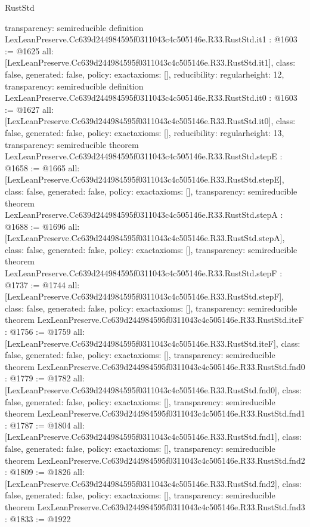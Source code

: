 \begin{lexlean}{RustStd}
\begin{coremodule}
{  transparency: semireducible
}
definition LexLeanPreserve.Cc639d244984595f0311043c4c505146e.R33.RustStd.it1 : @1603 := @1625 {
  all: [LexLeanPreserve.Cc639d244984595f0311043c4c505146e.R33.RustStd.it1],
  class: false,
  generated: false,
  policy: exact{axioms: []},
  reducibility: regular{height: 12},
  transparency: semireducible
}
definition LexLeanPreserve.Cc639d244984595f0311043c4c505146e.R33.RustStd.it0 : @1603 := @1627 {
  all: [LexLeanPreserve.Cc639d244984595f0311043c4c505146e.R33.RustStd.it0],
  class: false,
  generated: false,
  policy: exact{axioms: []},
  reducibility: regular{height: 13},
  transparency: semireducible
}
theorem LexLeanPreserve.Cc639d244984595f0311043c4c505146e.R33.RustStd.stepE : @1658 := @1665 {
  all: [LexLeanPreserve.Cc639d244984595f0311043c4c505146e.R33.RustStd.stepE],
  class: false,
  generated: false,
  policy: exact{axioms: []},
  transparency: semireducible
}
theorem LexLeanPreserve.Cc639d244984595f0311043c4c505146e.R33.RustStd.stepA : @1688 := @1696 {
  all: [LexLeanPreserve.Cc639d244984595f0311043c4c505146e.R33.RustStd.stepA],
  class: false,
  generated: false,
  policy: exact{axioms: []},
  transparency: semireducible
}
theorem LexLeanPreserve.Cc639d244984595f0311043c4c505146e.R33.RustStd.stepF : @1737 := @1744 {
  all: [LexLeanPreserve.Cc639d244984595f0311043c4c505146e.R33.RustStd.stepF],
  class: false,
  generated: false,
  policy: exact{axioms: []},
  transparency: semireducible
}
theorem LexLeanPreserve.Cc639d244984595f0311043c4c505146e.R33.RustStd.iteF : @1756 := @1759 {
  all: [LexLeanPreserve.Cc639d244984595f0311043c4c505146e.R33.RustStd.iteF],
  class: false,
  generated: false,
  policy: exact{axioms: []},
  transparency: semireducible
}
theorem LexLeanPreserve.Cc639d244984595f0311043c4c505146e.R33.RustStd.fnd0 : @1779 := @1782 {
  all: [LexLeanPreserve.Cc639d244984595f0311043c4c505146e.R33.RustStd.fnd0],
  class: false,
  generated: false,
  policy: exact{axioms: []},
  transparency: semireducible
}
theorem LexLeanPreserve.Cc639d244984595f0311043c4c505146e.R33.RustStd.fnd1 : @1787 := @1804 {
  all: [LexLeanPreserve.Cc639d244984595f0311043c4c505146e.R33.RustStd.fnd1],
  class: false,
  generated: false,
  policy: exact{axioms: []},
  transparency: semireducible
}
theorem LexLeanPreserve.Cc639d244984595f0311043c4c505146e.R33.RustStd.fnd2 : @1809 := @1826 {
  all: [LexLeanPreserve.Cc639d244984595f0311043c4c505146e.R33.RustStd.fnd2],
  class: false,
  generated: false,
  policy: exact{axioms: []},
  transparency: semireducible
}
theorem LexLeanPreserve.Cc639d244984595f0311043c4c505146e.R33.RustStd.fnd3 : @1833 := @1922 {
}
\end{coremodule}
\end{lexlean}
